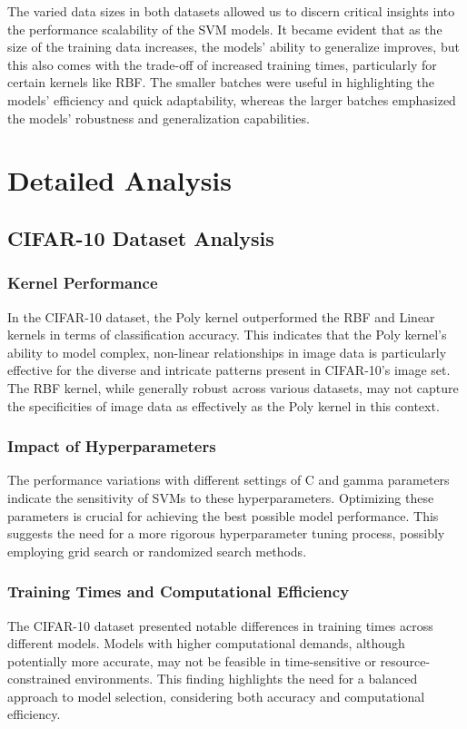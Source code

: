 \documentclass[conference]{IEEEtran}
\begin{document}
The varied data sizes in both datasets allowed us to discern critical insights into the performance scalability of the SVM models. It became evident that as the size of the training data increases, the models' ability to generalize improves, but this also comes with the trade-off of increased training times, particularly for certain kernels like RBF. The smaller batches were useful in highlighting the models' efficiency and quick adaptability, whereas the larger batches emphasized the models' robustness and generalization capabilities.

\section{Detailed Analysis}

\subsection{CIFAR-10 Dataset Analysis}

\subsubsection{Kernel Performance}
In the CIFAR-10 dataset, the Poly kernel outperformed the RBF and Linear kernels in terms of classification accuracy. This indicates that the Poly kernel's ability to model complex, non-linear relationships in image data is particularly effective for the diverse and intricate patterns present in CIFAR-10's image set. The RBF kernel, while generally robust across various datasets, may not capture the specificities of image data as effectively as the Poly kernel in this context.

\subsubsection{Impact of Hyperparameters}
The performance variations with different settings of C and gamma parameters indicate the sensitivity of SVMs to these hyperparameters. Optimizing these parameters is crucial for achieving the best possible model performance. This suggests the need for a more rigorous hyperparameter tuning process, possibly employing grid search or randomized search methods.

\subsubsection{Training Times and Computational Efficiency}
The CIFAR-10 dataset presented notable differences in training times across different models. Models with higher computational demands, although potentially more accurate, may not be feasible in time-sensitive or resource-constrained environments. This finding highlights the need for a balanced approach to model selection, considering both accuracy and computational efficiency.
\end{document}
